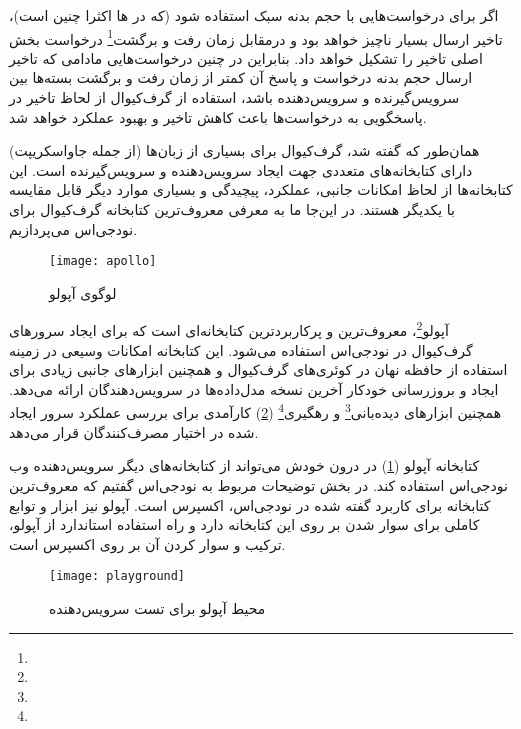 اگر  برای درخواست‌هایی با حجم بدنه سبک استفاده شود (که در ها اکثرا چنین است)، تاخیر ارسال بسیار ناچیز خواهد بود و درمقابل زمان رفت و برگشت\footnote{} درخواست بخش اصلی تاخیر را تشکیل خواهد داد. بنابراین در چنین درخواست‌هایی مادامی که تاخیر ارسال حجم بدنه درخواست و پاسخ آن کمتر از زمان رفت و برگشت بسته‌ها بین سرویس‌گیرنده و سرویس‌دهنده باشد، استفاده از گرف‌کیوال از لحاظ تاخیر در پاسخگویی به درخواست‌ها باعث کاهش تاخیر و بهبود عملکرد خواهد شد. 


همان‌طور که گفته شد، گرف‌کیوال برای بسیاری از زبان‌ها (از جمله جاواسکریپت) دارای کتابخانه‌های متعددی جهت ایجاد سرویس‌دهنده و سرویس‌گیرنده است. این کتابخانه‌ها از لحاظ امکانات جانبی، عملکرد، پیچیدگی و بسیاری موارد دیگر قابل مقایسه با یکدیگر هستند. در این‌جا ما به معرفی معروف‌ترین کتابخانه گرف‌کیوال برای نودجی‌اس می‌پردازیم.


\begin{figure}[H]
	\centering
	\texttt{[image: apollo]}
	\caption{لوگوی آپولو}
	\label{fig:apollo}
\end{figure}


آپولو\footnote{}، معروف‌ترین و پرکاربردترین کتابخانه‌ای است که برای ایجاد سرورهای گرف‌کیوال در نودجی‌اس استفاده می‌شود. این کتابخانه امکانات وسیعی در زمینه استفاده از حافظه نهان در کوئری‌های گرف‌کیوال و همچنین ابزارهای جانبی زیادی برای ایجاد و بروزرسانی خودکار آخرین نسخه مدل‌داده‌ها در سرویس‌دهندگان ارائه می‌دهد. همچنین ابزارهای دیده‌بانی\footnote{} و رهگیری\footnote{} (\cref{fig:playground}) کارآمدی برای بررسی عملکرد سرور ایجاد شده در اختیار مصرف‌کنندگان قرار می‌دهد\cite{apollo}.

کتابخانه آپولو (\cref{fig:apollo}) در درون خودش می‌تواند از کتابخانه‌های دیگر سرویس‌دهنده وب نودجی‌اس استفاده کند. در بخش توضیحات مربوط به نودجی‌اس گفتیم که معروف‌ترین کتابخانه برای کاربرد گفته شده در نودجی‌اس، اکسپرس است. آپولو نیز ابزار و توابع کاملی برای سوار شدن بر روی این کتابخانه دارد و راه استفاده استاندارد از آپولو، ترکیب و سوار کردن آن بر روی اکسپرس است.

\begin{figure}[H]
	\centering
	\texttt{[image: playground]}
	\caption{محیط  آپولو برای تست سرویس‌دهنده}
	\label{fig:playground}
\end{figure}
 


